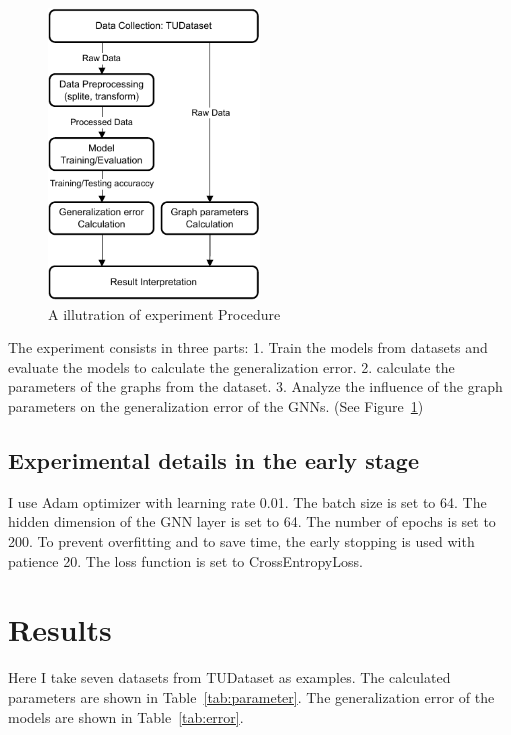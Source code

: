 \documentclass{article}
\begin{document}
\begin{figure}[h]
    \centering
    \includegraphics[width=0.5\textwidth]{experiment_procedure.pdf}
    \caption{A illutration of experiment Procedure}
    \label{fig:experiment}
\end{figure}

The experiment consists in three parts: 1. Train the models from datasets and evaluate the models to calculate the generalization error. 2. calculate the parameters of the graphs from the dataset. 3. Analyze the influence of the graph parameters on the generalization error of the GNNs. (See Figure~\ref{fig:experiment})


\subsection{Experimental details in the early stage}
I use Adam optimizer with learning rate 0.01. The batch size is set to 64. The hidden dimension of the GNN layer is set to 64. The number of epochs is set to 200. To prevent overfitting and to save time, the early stopping is used with patience 20. The loss function is set to CrossEntropyLoss. 

\section{Results}

Here I take seven datasets from TUDataset as examples. The calculated parameters are shown in Table~\ref{tab:parameter}. The generalization error of the models are shown in Table~\ref{tab:error}. 
\end{document}
